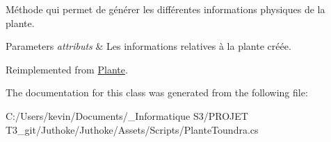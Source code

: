 Méthode qui permet de générer les différentes informations physiques de la plante. 
\begin{DoxyParams}{Parameters}
{\em attributs} & Les informations relatives à la plante créée. \\
\hline
\end{DoxyParams}


Reimplemented from \mbox{\hyperlink{class_plante_a57fe2932f99367a29150ac5280fda729}{Plante}}.



The documentation for this class was generated from the following file\+:\begin{DoxyCompactItemize}
\item 
C\+:/\+Users/kevin/\+Documents/\+\_\+\+Informatique S3/\+P\+R\+O\+J\+E\+T T3\+\_\+git/\+Juthoke/\+Juthoke/\+Assets/\+Scripts/Plante\+Toundra.\+cs\end{DoxyCompactItemize}

